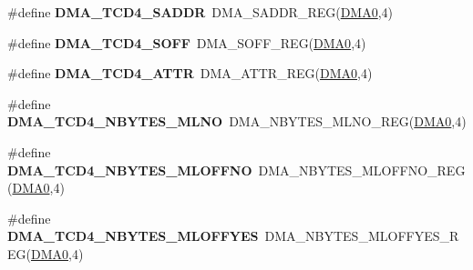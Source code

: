 \begin{DoxyCompactItemize}
\item 
\#define {\bfseries D\+M\+A\+\_\+\+T\+C\+D4\+\_\+\+S\+A\+D\+DR}~D\+M\+A\+\_\+\+S\+A\+D\+D\+R\+\_\+\+R\+EG(\hyperlink{group__DMA__Peripheral__Access__Layer_ga4103044f9ca209772f513dc694513ffb}{D\+M\+A0},4)\hypertarget{group__DMA__Register__Accessor__Macros_ga6cc7248c1aac9b222666d2527404eb72}{}\label{group__DMA__Register__Accessor__Macros_ga6cc7248c1aac9b222666d2527404eb72}

\item 
\#define {\bfseries D\+M\+A\+\_\+\+T\+C\+D4\+\_\+\+S\+O\+FF}~D\+M\+A\+\_\+\+S\+O\+F\+F\+\_\+\+R\+EG(\hyperlink{group__DMA__Peripheral__Access__Layer_ga4103044f9ca209772f513dc694513ffb}{D\+M\+A0},4)\hypertarget{group__DMA__Register__Accessor__Macros_gac5daecfc1646478ddba0208c44bd95de}{}\label{group__DMA__Register__Accessor__Macros_gac5daecfc1646478ddba0208c44bd95de}

\item 
\#define {\bfseries D\+M\+A\+\_\+\+T\+C\+D4\+\_\+\+A\+T\+TR}~D\+M\+A\+\_\+\+A\+T\+T\+R\+\_\+\+R\+EG(\hyperlink{group__DMA__Peripheral__Access__Layer_ga4103044f9ca209772f513dc694513ffb}{D\+M\+A0},4)\hypertarget{group__DMA__Register__Accessor__Macros_gafd8951a9fcbce81a5a61e455663f75b6}{}\label{group__DMA__Register__Accessor__Macros_gafd8951a9fcbce81a5a61e455663f75b6}

\item 
\#define {\bfseries D\+M\+A\+\_\+\+T\+C\+D4\+\_\+\+N\+B\+Y\+T\+E\+S\+\_\+\+M\+L\+NO}~D\+M\+A\+\_\+\+N\+B\+Y\+T\+E\+S\+\_\+\+M\+L\+N\+O\+\_\+\+R\+EG(\hyperlink{group__DMA__Peripheral__Access__Layer_ga4103044f9ca209772f513dc694513ffb}{D\+M\+A0},4)\hypertarget{group__DMA__Register__Accessor__Macros_ga15f1f1198c82e029336d290baffd758a}{}\label{group__DMA__Register__Accessor__Macros_ga15f1f1198c82e029336d290baffd758a}

\item 
\#define {\bfseries D\+M\+A\+\_\+\+T\+C\+D4\+\_\+\+N\+B\+Y\+T\+E\+S\+\_\+\+M\+L\+O\+F\+F\+NO}~D\+M\+A\+\_\+\+N\+B\+Y\+T\+E\+S\+\_\+\+M\+L\+O\+F\+F\+N\+O\+\_\+\+R\+EG(\hyperlink{group__DMA__Peripheral__Access__Layer_ga4103044f9ca209772f513dc694513ffb}{D\+M\+A0},4)\hypertarget{group__DMA__Register__Accessor__Macros_ga6366797b418a1074278f15243b4ef66c}{}\label{group__DMA__Register__Accessor__Macros_ga6366797b418a1074278f15243b4ef66c}

\item 
\#define {\bfseries D\+M\+A\+\_\+\+T\+C\+D4\+\_\+\+N\+B\+Y\+T\+E\+S\+\_\+\+M\+L\+O\+F\+F\+Y\+ES}~D\+M\+A\+\_\+\+N\+B\+Y\+T\+E\+S\+\_\+\+M\+L\+O\+F\+F\+Y\+E\+S\+\_\+\+R\+EG(\hyperlink{group__DMA__Peripheral__Access__Layer_ga4103044f9ca209772f513dc694513ffb}{D\+M\+A0},4)\hypertarget{group__DMA__Register__Accessor__Macros_gaf819508a4a70a0d564efc5f86e92ce3e}{}\label{group__DMA__Register__Accessor__Macros_gaf819508a4a70a0d564efc5f86e92ce3e}


\end{DoxyCompactItemize}
